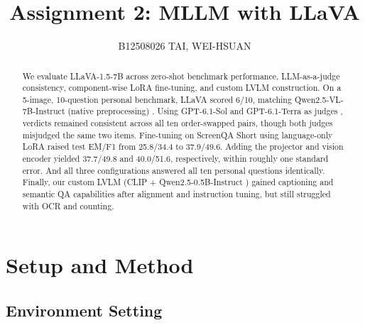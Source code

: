 \documentclass[10pt,twocolumn,letterpaper]{article}
\title{Assignment 2: MLLM with LLaVA}
\author{B12508026 TAI, WEI-HSUAN}
\begin{document}
\maketitle



\begin{abstract}
We evaluate LLaVA-1.5-7B \cite{NEURIPS2023_6dcf277e,liu2023improvedllava,llavahf2023llava15_7b} across zero-shot benchmark performance, LLM-as-a-judge consistency, component-wise LoRA fine-tuning, and custom LVLM construction. On a 5-image, 10-question personal benchmark, LLaVA scored 6/10, matching Qwen2.5-VL-7B-Instruct (native preprocessing) \cite{bai2025qwen25vl,qwen25vl7b_hf}. Using GPT-6.1-Sol and GPT-6.1-Terra as judges \cite{openai2026gpt61sol_card,openai2026gpt61terra_card}, verdicts remained consistent across all ten order-swapped pairs, though both judges misjudged the same two items. Fine-tuning on ScreenQA Short \cite{hsiao2024screenqa} using language-only LoRA raised test EM/F1 from 25.8/34.4 to 37.9/49.6. Adding the projector and vision encoder yielded 37.7/49.8 and 40.0/51.6, respectively, within roughly one standard error. And all three configurations answered all ten personal questions identically. Finally, our custom LVLM (CLIP \cite{radford2021clip} + Qwen2.5-0.5B-Instruct \cite{qwen2025qwen25}) gained captioning and semantic QA capabilities after alignment and instruction tuning, but still struggled with OCR and counting.
\end{abstract}


\section{Setup and Method}

\subsection{Environment Setting}
\end{document}
